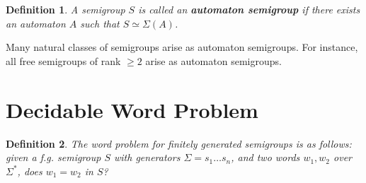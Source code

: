 \documentclass[a0,16pt]{a0poster}
\newcommand*{\concourse}{}
\theoremstyle{pleasant}
\newtheorem{definition}{Definition}
\newcommand{\0}{\underline{0}}
\newcommand{\1}{\underline{1}}
\newcommand{\2}{\underline{2}}
\renewcommand{\S}{\mathcal{S}}
\begin{document}
\begin{multicols}{3}
\begin{definition}
A semigroup $S$ is called an \textbf{automaton semigroup} if there exists an automaton $A$ such that $S \simeq \Sigma(A)$.
\end{definition}

Many natural classes of semigroups arise as automaton semigroups. For instance, all free semigroups of rank $\geq 2$ arise as automaton semigroups. 


\section*{Decidable Word Problem}

\begin{definition} 
The word problem for finitely generated semigroups is as follows: given a f.g. semigroup $S$ with generators $\Sigma = s_1 \ldots s_n$, and two words $w_1, w_2$ over $\Sigma^*$, does $w_1 = w_2$ in $S$?
\end{definition} 


\end{multicols}
\end{document}
